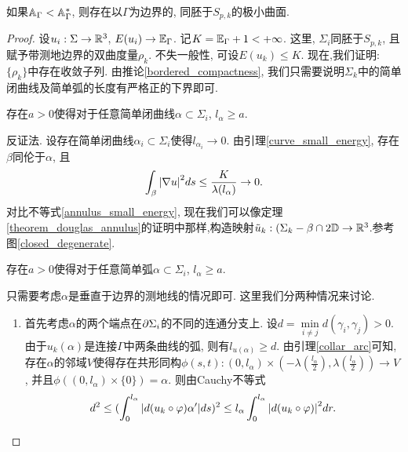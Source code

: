 \begin{theorem}
    如果$\AA_\Gamma < \AA_\Gamma^*$, 则存在以$\Gamma$为边界的, 同胚于$S_{p,k}$的极小曲面.
\end{theorem}
\begin{proof}
    设$u_i: \Sigma \to \R^3$, $E(u_i) \to \EE_{\Gamma}$.  记$K=\EE_{\Gamma}+1 < +\infty$. 这里, $\Sigma_i$同胚于$S_{p,k}$, 且赋予带测地边界的双曲度量$\rho_k$. 不失一般性, 可设$E(u_k) \le K$. 现在,我们证明: $\{\rho_k\}$中存在收敛子列.  由推论\eqref{bordered_compactness}, 我们只需要说明$\Sigma_k$中的简单闭曲线及简单弧的长度有严格正的下界即可.
    \begin{claim}
        存在$a>0$使得对于任意简单闭曲线$\alpha \subset \Sigma_i$, $l_\alpha \ge a$.
        \begin{subproof}
            反证法. 设存在简单闭曲线$\alpha_i\subset \Sigma_i$使得$l_{\alpha_i} \to 0$. 由引理\eqref{curve_small_energy}, 存在$\beta$同伦于$\alpha$, 且
            \begin{equation}
                \int_\beta \abs{\nabla u}^2 ds \le \frac{K}{\lambda(l_\alpha)} \to 0.
            \end{equation}
            对比不等式\eqref{annulus_small_energy}, 现在我们可以像定理\eqref{theorem_douglas_annulus}的证明中那样,构造映射$\tilde{u}_k: (\Sigma_k-\beta \cap 2\D \to \R^3$.参考图\eqref{closed_degenerate}.
        \end{subproof}
    \end{claim}
    \begin{claim}
        存在$a>0$使得对于任意简单弧$\alpha \subset \Sigma_i$, $l_\alpha \ge a$.
        \begin{subproof}
            只需要考虑$\alpha$是垂直于边界的测地线的情况即可. 这里我们分两种情况来讨论.  
            \begin{enumerate}
                \item 首先考虑$\alpha$的两个端点在$\P \Sigma_i$的不同的连通分支上. 设$d=\mathop{\min}\limits_{i\ne j} d(\gamma_i,\gamma_j)>0$. 由于$u_k(\alpha)$是连接$\Gamma$中两条曲线的弧, 则有$l_{u(\alpha)} \ge d$.  由引理\eqref{collar_arc}可知, 存在$\alpha$的邻域$V$使得存在共形同构$ \phi(s,t): (0,l_\alpha)\times (-\lambda(\frac{l_\alpha}{2}), \lambda(\frac{l_\alpha}{2})) \to V$, 并且$\phi((0,l_\alpha) \times \{0\})=\alpha$.  则由Cauchy不等式
                \begin{equation}
                    d^2 \le (\int^{l_\alpha}_0 \abs{d(u_k\circ\phi) \alpha'} ds)^2 \le l_\alpha \int^{l_\alpha}_0 \abs{d(u_k\circ \phi)}^2dr.
                \end{equation}

\end{enumerate}
\end{subproof}
\end{claim}
\end{proof}
